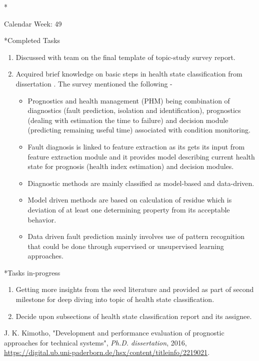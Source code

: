 \documentclass[11pt,a4paper]{article}
\begin{document}
\begin{section}*{Calendar Week: 49 \hfill \date{4 December, 2020}}

\begin{subsection}*{Completed Tasks}
    \begin{enumerate}
        \item 
            Discussed with team on the final template of topic-study survey report.
        \item
            Acquired brief knowledge on basic steps in health state classification from dissertation \cite{survey51}. The survey mentioned the following -
            \begin{itemize}
                \item Prognostics and health management (PHM) being combination of diagnostics (fault prediction, isolation and identification), prognostics (dealing with estimation the time to failure) and decision module (predicting remaining useful time) associated with condition monitoring.  
                \item Fault diagnosis is linked to feature extraction as its gets its input from feature extraction module and it provides model describing current health state for prognosis (health index estimation) and decision modules.
                \item Diagnostic methods are mainly classified as model-based and data-driven. 
                \item Model driven methods are based on calculation of residue which is deviation of at least one determining property from its acceptable behavior. 
                \item Data driven fault prediction mainly involves use of pattern recognition that could be done through supervised or unsupervised learning approaches.  
            \end{itemize}
             
    \end{enumerate}
\end{subsection}
\begin{subsection}*{Tasks in-progress}
    \begin{enumerate}
        \item
            Getting more insights from the seed literature\cite{survey52} and \cite{survey53} provided as part of second milestone for deep diving into topic of health state classification.
        \item
            Decide upon subsections of health state classification report and its assignee.
    \end{enumerate}
\end{subsection}
\begin{thebibliography}{9}
    {J. K. {Kimotho}},
    "Development and performance evaluation of prognostic approaches for technical systems",
    \textit{ Ph.D. dissertation},
    2016,
    \href{ https://digital.ub.uni-paderborn.de/hsx/content/titleinfo/2219021}{ https://digital.ub.uni-paderborn.de/hsx/content/titleinfo/2219021}.
    

\end{thebibliography}
\end{section}
\end{document}
